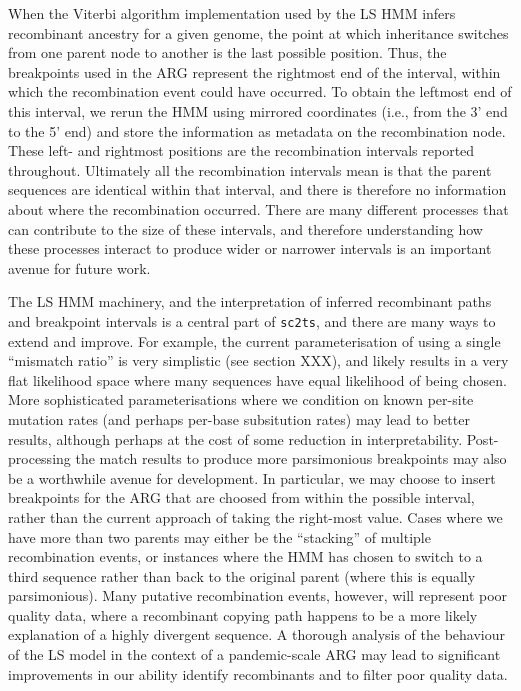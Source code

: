 \documentclass{article}
\begin{document}
When the Viterbi algorithm implementation used by the LS HMM infers
recombinant ancestry for a given genome, the point at which inheritance
switches from one parent node to another is the last possible
position.
Thus, the breakpoints used in the ARG represent the rightmost end of the
interval, within which the recombination event could have occurred. To obtain
the leftmost end of this interval, we rerun the HMM using mirrored coordinates
(i.e., from the 3’ end to the 5’ end) and store the information as
metadata on the recombination node.
These left- and rightmost positions
are the recombination intervals reported throughout.
Ultimately all the recombination intervals mean is that the parent sequences
are identical within that interval, and there is therefore no information
about where the recombination occurred. There are many different processes
that can contribute to the size of these intervals, and therefore
understanding how these processes interact to produce wider or narrower
intervals is an important avenue for future work.

The LS HMM machinery, and the interpretation of inferred recombinant paths and
breakpoint intervals is a central part of \texttt{sc2ts}, and there are many
ways to extend and improve. For example, the current parameterisation of using
a single ``mismatch ratio'' is very simplistic (see section XXX), and likely
results in a very flat likelihood space where many sequences have equal
likelihood of being chosen. More sophisticated parameterisations where we
condition on known per-site mutation rates (and perhaps per-base subsitution
rates) may lead to better results, although perhaps at the cost of some
reduction in interpretability. Post-processing the match results to produce
more parsimonious breakpoints may also be a worthwhile avenue for development.
In particular, we may choose to insert breakpoints for the ARG that are choosed
from within the possible interval, rather than the current approach of taking
the right-most value. Cases where we have more than two parents may either be
the ``stacking'' of multiple recombination events, or instances where
the HMM has chosen to switch to a third sequence rather than back to
the original parent (where this is equally parsimonious). Many putative
recombination events, however, will represent poor quality data, where
a recombinant copying path happens to be a more likely explanation
of a highly divergent sequence.
A thorough analysis of the behaviour of the LS model in the context
of a pandemic-scale ARG may lead to significant improvements in our
ability identify recombinants and to filter poor quality data.
\end{document}
